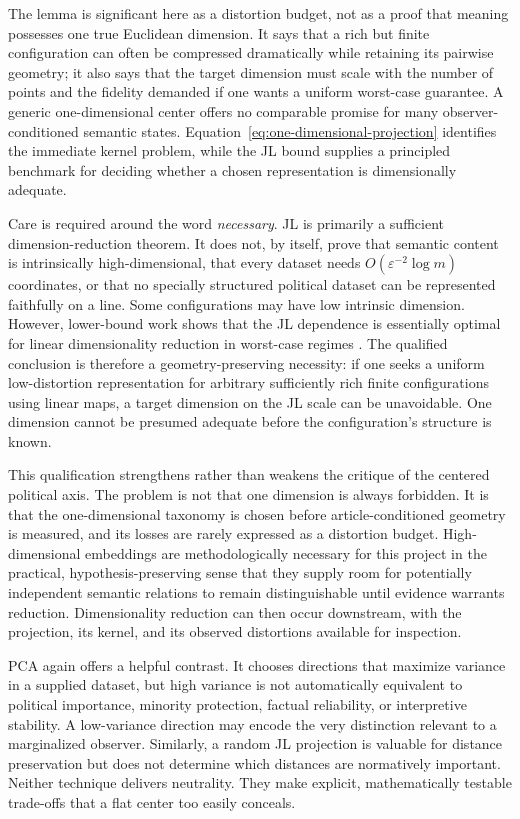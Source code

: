 The lemma is significant here as a distortion budget, not as a proof that meaning possesses one true Euclidean dimension. It says that a rich but finite configuration can often be compressed dramatically while retaining its pairwise geometry; it also says that the target dimension must scale with the number of points and the fidelity demanded if one wants a uniform worst-case guarantee. A generic one-dimensional center offers no comparable promise for many observer-conditioned semantic states. Equation~\eqref{eq:one-dimensional-projection} identifies the immediate kernel problem, while the JL bound supplies a principled benchmark for deciding whether a chosen representation is dimensionally adequate.

Care is required around the word \emph{necessary}. JL is primarily a sufficient dimension-reduction theorem. It does not, by itself, prove that semantic content is intrinsically high-dimensional, that every dataset needs \(O(\varepsilon^{-2}\log m)\) coordinates, or that no specially structured political dataset can be represented faithfully on a line. Some configurations may have low intrinsic dimension. However, lower-bound work shows that the JL dependence is essentially optimal for linear dimensionality reduction in worst-case regimes \citep{larsennelson2016}. The qualified conclusion is therefore a geometry-preserving necessity: if one seeks a uniform low-distortion representation for arbitrary sufficiently rich finite configurations using linear maps, a target dimension on the JL scale can be unavoidable. One dimension cannot be presumed adequate before the configuration's structure is known.

This qualification strengthens rather than weakens the critique of the centered political axis. The problem is not that one dimension is always forbidden. It is that the one-dimensional taxonomy is chosen before article-conditioned geometry is measured, and its losses are rarely expressed as a distortion budget. High-dimensional embeddings are methodologically necessary for this project in the practical, hypothesis-preserving sense that they supply room for potentially independent semantic relations to remain distinguishable until evidence warrants reduction. Dimensionality reduction can then occur downstream, with the projection, its kernel, and its observed distortions available for inspection.

PCA again offers a helpful contrast. It chooses directions that maximize variance in a supplied dataset, but high variance is not automatically equivalent to political importance, minority protection, factual reliability, or interpretive stability. A low-variance direction may encode the very distinction relevant to a marginalized observer. Similarly, a random JL projection is valuable for distance preservation but does not determine which distances are normatively important. Neither technique delivers neutrality. They make explicit, mathematically testable trade-offs that a flat center too easily conceals.

